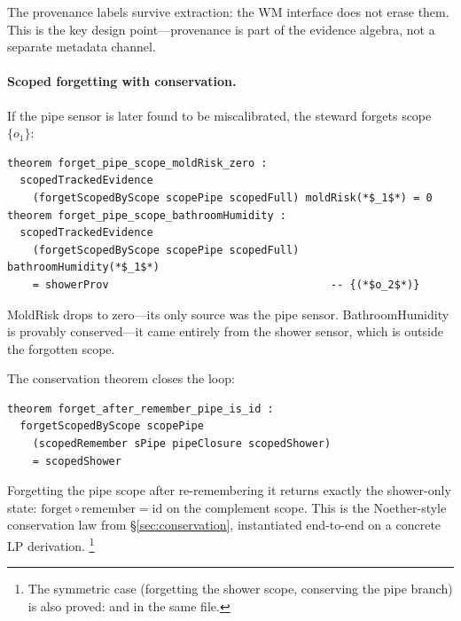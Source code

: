 \documentclass[11pt,openany]{report}
\begin{document}
\noindent
The provenance labels survive extraction: the WM interface does not
erase them.  This is the key design point---provenance is part of
the evidence algebra, not a separate metadata channel.

\paragraph{Scoped forgetting with conservation.}
If the pipe sensor is later found to be miscalibrated, the
steward forgets scope $\{o_1\}$:

\begin{lstlisting}[language={}]
theorem forget_pipe_scope_moldRisk_zero :
  scopedTrackedEvidence
    (forgetScopedByScope scopePipe scopedFull) moldRisk(*$_1$*) = 0
theorem forget_pipe_scope_bathroomHumidity :
  scopedTrackedEvidence
    (forgetScopedByScope scopePipe scopedFull) bathroomHumidity(*$_1$*)
    = showerProv                                   -- {(*$o_2$*)}
\end{lstlisting}

\noindent
MoldRisk drops to zero---its only source was the pipe sensor.
BathroomHumidity is provably conserved---it came entirely from the
shower sensor, which is outside the forgotten scope.

The conservation theorem closes the loop:

\begin{lstlisting}[language={}]
theorem forget_after_remember_pipe_is_id :
  forgetScopedByScope scopePipe
    (scopedRemember sPipe pipeClosure scopedShower)
    = scopedShower
\end{lstlisting}

\noindent
Forgetting the pipe scope after re-remembering it returns exactly
the shower-only state: $\mathrm{forget} \circ \mathrm{remember}
= \mathrm{id}$ on the complement scope.  This is the Noether-style
conservation law from \S\ref{sec:conservation}, instantiated end-to-end
on a concrete LP derivation.%
\footnote{The symmetric case (forgetting the shower scope,
conserving the pipe branch) is also proved:
 and
 in the same file.}

\end{document}
